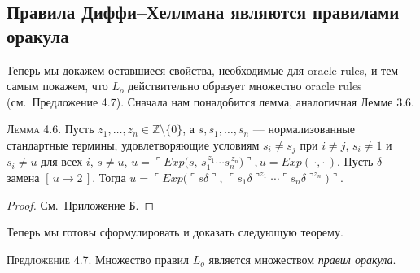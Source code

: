 \subsection{Правила Диффи–Хеллмана являются правилами оракула}

Теперь мы докажем оставшиеся свойства, необходимые для oracle rules, и тем самым покажем, что $L_{o}$ действительно образует множество oracle rules (см.~Предложение 4.7).  
Сначала нам понадобится лемма, аналогичная Лемме 3.6.

\textsc{Лемма 4.6.}
Пусть $z_{1},\dots ,z_{n}\in\mathbb Z\setminus\{0\}$,
а $s,s_{1},\dots ,s_{n}$ — нормализованные стандартные термины,
удовлетворяющие условиям
$s_{i}\neq s_{j}$ при $i\neq j$, 
$s_{i}\neq1$ и $s_{i}\neq u$ для всех $i$,
$s\neq u$,
\(
  u=\ulcorner Exp\bigl(s,\,
       s_{1}^{\,z_{1}}\!\cdots s_{n}^{\,z_{n}}\bigr)\urcorner,
  u=Exp(\,\cdot,\cdot\,).
\)
Пусть $\delta$ — замена $[\,u\!\rightarrow\!2\,]$.
Тогда
\(
  u
  =
  \ulcorner Exp\bigl(\ulcorner s\delta\urcorner,\,
        \ulcorner s_{1}\delta\urcorner^{z_{1}}\!\cdots
        \ulcorner s_{n}\delta\urcorner^{z_{n}}\bigr)\urcorner.
\)

\begin{proof} См.\ Приложение Б.\end{proof}

\medskip
Теперь мы готовы сформулировать и доказать следующую теорему.

\textsc{Предложение 4.7.}
Множество правил $L_{o}$ является множеством \emph{правил оракула}.

